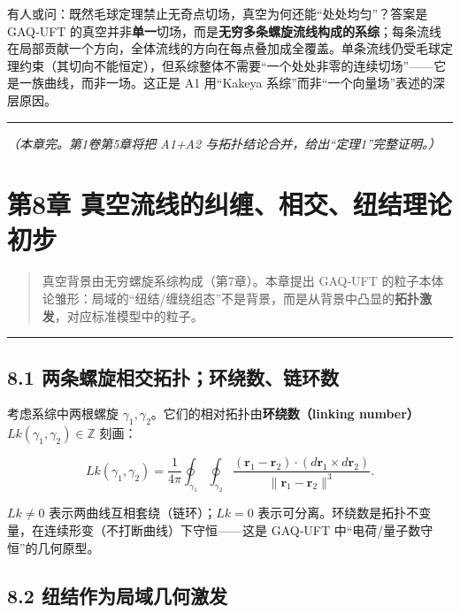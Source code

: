 有人或问：既然毛球定理禁止无奇点切场，真空为何还能``处处均匀''？答案是
GAQ‑UFT
的真空并非\textbf{单一}切场，而是\textbf{无穷多条螺旋流线构成的系综}；每条流线在局部贡献一个方向，全体流线的方向在每点叠加成全覆盖。单条流线仍受毛球定理约束（其切向不能恒定），但系综整体不需要``一个处处非零的连续切场''------它是一族曲线，而非一场。这正是
A1 用``Kakeya 系综''而非``一个向量场''表述的深层原因。

\begin{center}\rule{0.5\linewidth}{0.5pt}\end{center}

\emph{（本章完。第1卷第5章将把 A1+A2
与拓扑结论合并，给出``定理1''完整证明。）}

\section{第8章
真空流线的纠缠、相交、纽结理论初步}\label{ux7b2c8ux7ae0-ux771fux7a7aux6d41ux7ebfux7684ux7ea0ux7f20ux76f8ux4ea4ux7ebdux7ed3ux7406ux8bbaux521dux6b65-1}

\begin{quote}
真空背景由无穷螺旋系综构成（第7章）。本章提出 GAQ‑UFT
的粒子本体论雏形：局域的``纽结/缠绕组态''不是背景，而是从背景中凸显的\textbf{拓扑激发}，对应标准模型中的粒子。
\end{quote}

\begin{center}\rule{0.5\linewidth}{0.5pt}\end{center}

\subsection{8.1
两条螺旋相交拓扑；环绕数、链环数}\label{ux4e24ux6761ux87baux65cbux76f8ux4ea4ux62d3ux6251ux73afux7ed5ux6570ux94feux73afux6570}

考虑系综中两根螺旋
\(\gamma_1,\gamma_2\)。它们的相对拓扑由\textbf{环绕数（linking number）}
\(Lk(\gamma_1,\gamma_2)\in\mathbb{Z}\) 刻画：

\[
Lk(\gamma_1,\gamma_2)=\frac{1}{4\pi}\oint_{\gamma_1}\oint_{\gamma_2}
\frac{(\mathbf{r}_1-\mathbf{r}_2)\cdot(d\mathbf{r}_1\times d\mathbf{r}_2)}{\|\mathbf{r}_1-\mathbf{r}_2\|^3}.
\]

\(Lk\neq0\) 表示两曲线互相套绕（链环）；\(Lk=0\)
表示可分离。环绕数是拓扑不变量，在连续形变（不打断曲线）下守恒------这是
GAQ‑UFT 中``电荷/量子数守恒''的几何原型。

\subsection{8.2
纽结作为局域几何激发}\label{ux7ebdux7ed3ux4f5cux4e3aux5c40ux57dfux51e0ux4f55ux6fc0ux53d1}

